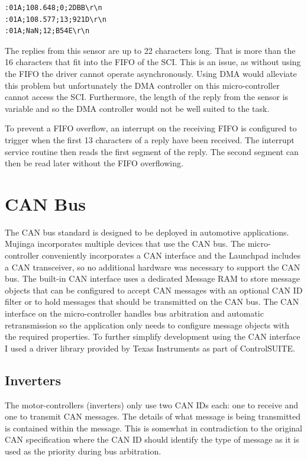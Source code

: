 \begin{verbatim}
:01A;108.648;0;2DBB\r\n
:01A;108.577;13;921D\r\n
:01A;NaN;12;B54E\r\n
\end{verbatim}

The replies from this sensor are up to 22 characters long. That is more than the 16 characters that fit into the FIFO of the SCI. This is an issue, as without using the FIFO the driver cannot operate asynchronously. Using DMA would alleviate this problem but unfortunately the DMA controller on this micro-controller cannot access the SCI. Furthermore, the length of the reply from the sensor is variable and so the DMA controller would not be well suited to the task.

To prevent a FIFO overflow, an interrupt on the receiving FIFO is configured to trigger when the first 13 characters of a reply have been received. The interrupt service routine then reads the first segment of the reply. The second segment can then be read later without the FIFO overflowing.

\section{CAN Bus}

The CAN bus standard is designed to be deployed in automotive applications. Mujinga incorporates multiple devices that use the CAN bus. The micro-controller conveniently incorporates a CAN interface and the Launchpad includes a CAN transceiver, so no additional hardware was necessary to support the CAN bus. The built-in CAN interface uses a dedicated Message RAM to store message objects that can be configured to accept CAN messages with an optional CAN ID filter or to hold messages that should be transmitted on the CAN bus. The CAN interface on the micro-controller handles bus arbitration and automatic retransmission so the application only needs to configure message objects with the required properties. To further simplify development using the CAN interface I used a driver library provided by Texas Instruments as part of ControlSUITE\cite{controlsuite}.

\subsection{Inverters}

The motor-controllers (inverters) only use two CAN IDs each: one to receive and one to transmit CAN messages. The details of what message is being transmitted is contained within the message. This is somewhat in contradiction to the original CAN specification where the CAN ID should identify the type of message as it is used as the priority during bus arbitration.

